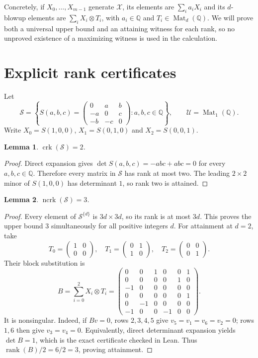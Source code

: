 \documentclass[11pt,letterpaper]{article}
\newtheorem{lemma}{Lemma}
\newcommand{\Q}{\mathbb{Q}}
\newcommand{\crk}{\operatorname{crk}}
\newcommand{\ncrk}{\operatorname{ncrk}}
\newcommand{\Mat}{\operatorname{Mat}}
\begin{document}
Concretely, if $X_0,\ldots,X_{m-1}$ generate $\mathcal X$, its elements
are $\sum_i a_iX_i$ and its $d$-blowup elements are
$\sum_i X_i\otimes T_i$, with $a_i\in\Q$ and $T_i\in\Mat_d(\Q)$.
We will prove both a universal upper bound and an attaining witness
for each rank, so no unproved existence of a maximizing witness is
used in the calculation.

\section{Explicit rank certificates}
Let
\[
 \mathcal S=\left\{
 S(a,b,c)=\begin{pmatrix}
 0&a&b\\-a&0&c\\-b&-c&0
 \end{pmatrix}:a,b,c\in\Q\right\},
 \qquad \mathcal U=\Mat_1(\Q).
\]
Write $X_0=S(1,0,0)$, $X_1=S(0,1,0)$ and $X_2=S(0,0,1)$.

\begin{lemma}\label{lem:comm}
$\crk(\mathcal S)=2$.
\end{lemma}
\begin{proof}
Direct expansion gives
$\det S(a,b,c)=-abc+abc=0$ for every $a,b,c\in\Q$.
Therefore every matrix in $\mathcal S$ has rank at most two.
The leading $2\times2$ minor of $S(1,0,0)$ has determinant $1$,
so rank two is attained.
\end{proof}

\begin{lemma}\label{lem:noncomm}
$\ncrk(\mathcal S)=3$.
\end{lemma}
\begin{proof}
Every element of $\mathcal S^{\{d\}}$ is $3d\times3d$, so its rank
is at most $3d$. This proves the upper bound $3$ simultaneously for
all positive integers $d$.
For attainment at $d=2$, take
\[
 T_0=\begin{pmatrix}1&0\\0&0\end{pmatrix},\quad
 T_1=\begin{pmatrix}0&1\\1&0\end{pmatrix},\quad
 T_2=\begin{pmatrix}0&0\\0&1\end{pmatrix}.
\]
Their block substitution is
\begin{equation}\label{eq:blowup}
 B=\sum_{i=0}^2 X_i\otimes T_i
 =\begin{pmatrix}
 0&0&1&0&0&1\\
 0&0&0&0&1&0\\
 -1&0&0&0&0&0\\
 0&0&0&0&0&1\\
 0&-1&0&0&0&0\\
 -1&0&0&-1&0&0
 \end{pmatrix}.
\end{equation}
It is nonsingular. Indeed, if $Bv=0$, rows $2,3,4,5$ give
$v_5=v_1=v_6=v_2=0$; rows $1,6$ then give $v_3=v_4=0$.
Equivalently, direct determinant expansion yields $\det B=1$,
which is the exact certificate checked in Lean.
Thus $\operatorname{rank}(B)/2=6/2=3$, proving attainment.
\end{proof}
\end{document}
